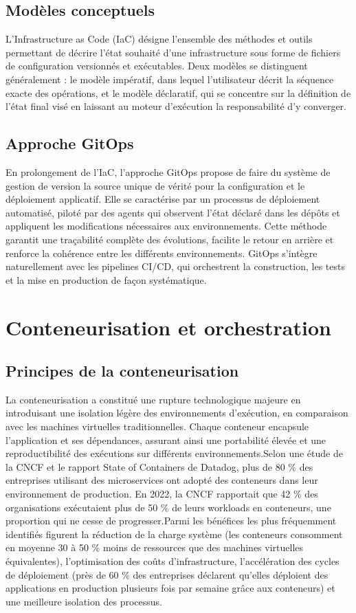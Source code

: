 \subsection{Modèles conceptuels}

L’Infrastructure as Code (IaC) désigne l’ensemble des méthodes et outils permettant de décrire l’état souhaité d’une infrastructure sous forme de fichiers de configuration versionnés et exécutables. Deux modèles se distinguent généralement : le modèle impératif, dans lequel l’utilisateur décrit la séquence exacte des opérations, et le modèle déclaratif, qui se concentre sur la définition de l’état final visé en laissant au moteur d’exécution la responsabilité d’y converger.

\subsection{Approche GitOps}

En prolongement de l’IaC, l’approche GitOps propose de faire du système de gestion de version la source unique de vérité pour la configuration et le déploiement applicatif. Elle se caractérise par un processus de déploiement automatisé, piloté par des agents qui observent l’état déclaré dans les dépôts et appliquent les modifications nécessaires aux environnements. Cette méthode garantit une traçabilité complète des évolutions, facilite le retour en arrière et renforce la cohérence entre les différents environnements. GitOps s’intègre naturellement avec les pipelines CI/CD, qui orchestrent la construction, les tests et la mise en production de façon systématique.

\section{Conteneurisation et orchestration}

\subsection{Principes de la conteneurisation}

La conteneurisation a constitué une rupture technologique majeure en introduisant une isolation légère des environnements d’exécution, en comparaison avec les machines virtuelles traditionnelles. Chaque conteneur encapsule l’application et ses dépendances, assurant ainsi une portabilité élevée et une reproductibilité des exécutions sur différents environnements.Selon une étude de la CNCF et le rapport State of Containers de Datadog, plus de 80 \% des entreprises utilisant des microservices ont adopté des conteneurs dans leur environnement de production. En 2022, la CNCF rapportait que 42 \% des organisations exécutaient plus de 50 \% de leurs workloads en conteneurs, une proportion qui ne cesse de progresser.Parmi les bénéfices les plus fréquemment identifiés figurent la réduction de la charge système (les conteneurs consomment en moyenne 30 à 50 \% moins de ressources que des machines virtuelles équivalentes), l’optimisation des coûts d’infrastructure, l’accélération des cycles de déploiement (près de 60 \% des entreprises déclarent qu’elles déploient des applications en production plusieurs fois par semaine grâce aux conteneurs) et une meilleure isolation des processus.
